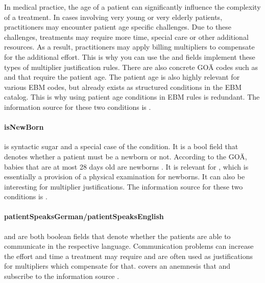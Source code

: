 In medical practice, the age of a patient can significantly influence the complexity of a treatment.
In cases involving very young or very elderly patients, practitioners may encounter patient age specific challenges.
Due to these challenges, treatments may require more time, special care or other additional resources.
As a result, practitioners may apply billing multipliers to compensate for the additional effort.
This is why you can use the  and  fields implement these types of multiplier justification rules.
There are also concrete GOÄ codes such as  and  that require the patient age.
The patient age is also highly relevant for various EBM codes, but already exists as structured conditions in the EBM catalog.
This is why using patient age conditions in EBM rules is redundant.
The information source for these two conditions is .

\paragraph{isNewBorn}
 is syntactic sugar and a special case of the  condition.
It is a bool field that denotes whether a patient must be a newborn or not.
According to the GOÄ, babies that are at most 28 days old are newborns \cite{bruck1998kommentar}.
It is relevant for , which is essentially a provision of a physical examination for newborns.
It can also be interesting for multiplier justifications.
The information source for these two conditions is .

\paragraph{patientSpeaksGerman/patientSpeaksEnglish}
 and  are both boolean fields that denote whether the patients are able to communicate in the respective language.
Communication problems can increase the effort and time a treatment may require and are often used as justifications for multipliers which compensate for that.
 covers an anemnesis that 
 and  subscribe to the information source .


